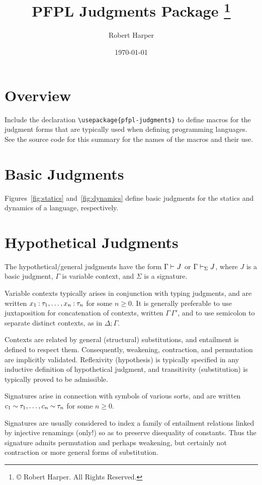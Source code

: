 \documentclass[11pt]{article}
\title{\textsf{PFPL} Judgments Package%
\footnote{\copyright{} \the\year{} Robert Harper.  All Rights Reserved.}}
\author{Robert Harper}
\date{\today}
\begin{document}
\maketitle{}

\section*{Overview}

Include the declaration \verb|\usepackage{pfpl-judgments}| to define macros for the judgment forms that are typically used when defining programming languages.  See the source code for this summary for the names of the macros and their use.

\section*{Basic Judgments}

Figures~\ref{fig:statics} and~\ref{fig:dynamics} define basic judgments for the statics and dynamics of a language, respectively.

\section*{Hypothetical Judgments}

The hypothetical/general judgments have the form $\Gamma\entails J$ or $\Gamma\entails[\Sigma] J$, where $J$ is a basic judgment, $\Gamma$ is variable context, and $\Sigma$ is a signature.

Variable contexts typically arises in conjunction with typing judgments, and are written $\isOf*{x_1}{\tau_1},\dots,\isOf*{x_n}{\tau_n}$ for some $n\geq 0$.
It is generally preferable to use juxtaposition for concatenation of contexts, written $\Gamma\,\Gamma'$, and to use semicolon to separate distinct contexts, as in $\Delta;\Gamma$.

Contexts are related by general (structural) substitutions, and entailment is defined to respect them.  Consequently, weakening, contraction, and permutation are implicitly validated.  Reflexivity (hypothesis) is typically specified in any inductive definition of hypothetical judgment, and transitivity (substitution) is typically proved to be admissible.

Signatures arise in connection with symbols of various sorts, and are written $\hasTp*{c_1}{\tau_1},\dots,\hasTp*{c_n}{\tau_n}$ for some $n\geq 0$.

Signatures are usually considered to index a family of entailment relations linked by injective renamings (only!) so as to preserve disequality of constants.  Thus the signature admits permutation and perhaps weakening, but certainly not contraction or more general forms of substitution.
\end{document}
